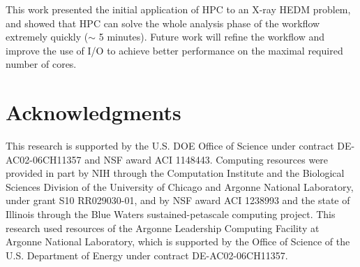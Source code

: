 \documentclass[conference,10pt]{IEEEtran}
\begin{document}
This work presented the initial application of HPC to an X-ray HEDM
problem, and showed that HPC can solve the whole analysis phase of the
workflow extremely quickly ($\sim$ 5 minutes).  Future work will
refine the workflow and improve the use of I/O to achieve better
performance on the maximal required number of cores. 

\section*{Acknowledgments}

This research is supported by the U.S. DOE Office of Science under
contract DE-AC02-06CH11357 and NSF award ACI 1148443.  Computing
resources were provided in part by NIH through the Computation
Institute and the Biological Sciences Division of the University of
Chicago and Argonne National Laboratory, under grant S10 RR029030-01,
and by NSF award ACI 1238993 and the state of Illinois through the
Blue Waters sustained-petascale computing project. This research used
resources of the Argonne Leadership Computing Facility at Argonne
National Laboratory, which is supported by the Office of Science of
the U.S. Department of Energy under contract DE-AC02-06CH11357.

\end{document}
